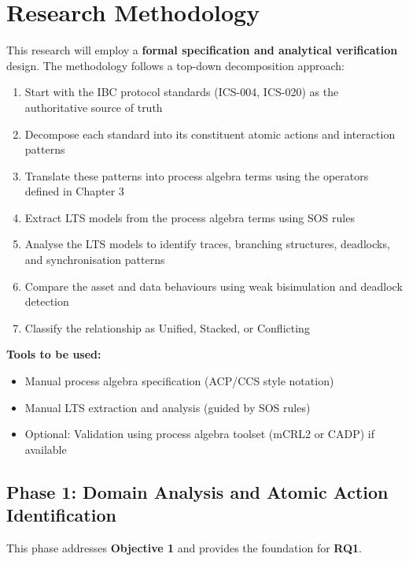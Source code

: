 \section{Research Methodology}\label{research-methodology}

This research will employ a
\textbf{formal specification and analytical verification} design. The
methodology follows a top-down decomposition approach:

\begin{enumerate}
    \item Start with the IBC protocol standards (ICS-004, ICS-020) as the authoritative source of truth
    \item Decompose each standard into its constituent atomic actions and interaction patterns
    \item Translate these patterns into process algebra terms using the operators defined in Chapter 3
    \item Extract LTS models from the process algebra terms using SOS rules
    \item Analyse the LTS models to identify traces, branching structures, deadlocks, and synchronisation patterns
    \item Compare the asset and data behaviours using weak bisimulation and deadlock detection
    \item Classify the relationship as Unified, Stacked, or Conflicting
\end{enumerate}

\textbf{Tools to be used:}

\begin{itemize}
    \item Manual process algebra specification (ACP/CCS style notation)
    \item Manual LTS extraction and analysis (guided by SOS rules)
    \item Optional: Validation using process algebra toolset (mCRL2 or CADP) if available
\end{itemize}

\subsection{Phase 1: Domain Analysis and Atomic Action
Identification}\label{phase-1-domain-analysis-and-atomic-action-identification}

This phase addresses \textbf{Objective 1} and provides the foundation
for \textbf{RQ1}.

